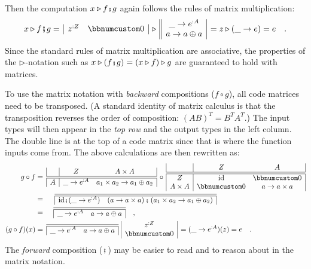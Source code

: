 Then the computation $x\triangleright f\bef g$ again follows the
rules of matrix multiplication:
\[
x\triangleright f\bef g=\,\begin{array}{|cc|}
z^{:Z} & \bbnum 0\end{array}\,\triangleright\,\begin{array}{||c|}
\_\rightarrow e^{:A}\\
a\rightarrow a\oplus a
\end{array}\,=z\triangleright(\_\rightarrow e)=e\quad.
\]
Since the standard rules of matrix multiplication are associative,
the properties of the $\triangleright$-notation such as $x\triangleright(f\bef g)=(x\triangleright f)\triangleright g$
are guaranteed to hold with matrices.

To use the matrix notation with \emph{backward} compositions ($f\circ g$),
all code matrices need to be transposed. (A standard identity of matrix
calculus is that the transposition reverses the order of composition:
$\left(AB\right)^{T}=B^{T}A^{T}$.) The input types will then appear
in the \emph{top} \emph{row} and the output types in the left column.
The double line is at the top of a code matrix since that is where
the function inputs come from. The above calculations are then rewritten
as:
\begin{align*}
g\circ f & =\,\begin{array}{|c|cc|}
 & Z & A\times A\\
\hline\hline A & \_\rightarrow e^{:A} & a_{1}\times a_{2}\rightarrow a_{1}\oplus a_{2}
\end{array}\,\circ\,\begin{array}{|c|cc|}
 & Z & A\\
\hline\hline Z & \text{id} & \bbnum 0\\
A\times A & \bbnum 0 & a\rightarrow a\times a
\end{array}\\
 & =\quad\,\,\begin{array}{|cc|}
\hline\hline \text{id}\bef(\_\rightarrow e^{:A}) & \left(a\rightarrow a\times a\right)\bef\left(a_{1}\times a_{2}\rightarrow a_{1}\oplus a_{2}\right)\end{array}\\
 & =\quad\,\begin{array}{|cc|}
\hline\hline \_\rightarrow e^{:A} & a\rightarrow a\oplus a\end{array}\quad,\\
(g\circ f)(x) & =\,\begin{array}{|cc|}
\hline\hline \_\rightarrow e^{:A} & a\rightarrow a\oplus a\end{array}\,\,\begin{array}{|c|}
z^{:Z}\\
\bbnum 0
\end{array}\,=(\_\rightarrow e^{:A})(z)=e\quad.
\end{align*}
The \emph{forward} composition ($\bef$) may be easier to read and
to reason about in the matrix notation.

